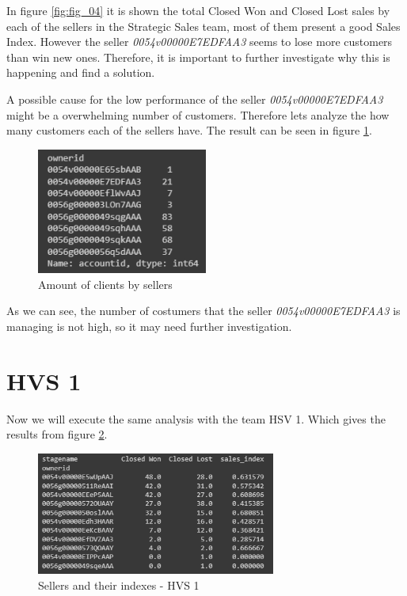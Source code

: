 \documentclass[]{report}
\begin{document}
In figure \ref{fig:fig_04} it is shown the total Closed Won and Closed Lost sales by each of the sellers in the Strategic Sales team, most of them present a good Sales Index. However the seller \textit{0054v00000E7EDFAA3} seems to lose more customers than win new ones. Therefore, it is important to further investigate why this is happening and find a solution.

A possible cause for the low performance of the seller \textit{0054v00000E7EDFAA3} might be a overwhelming number of customers. Therefore lets analyze the how many customers each of the sellers have. The result can be seen in figure \ref{fig:fig_05}.

\begin{figure}[htb]
	\centering
	\includegraphics[width=0.50\textwidth]{fig_05_customer_and_sellers}
	\caption{Amount of clients by sellers}
	\label{fig:fig_05}
\end{figure}

As we can see, the number of costumers that the seller \textit{0054v00000E7EDFAA3} is managing is not high, so it may need further investigation.

\section{HVS 1}

Now we will execute the same analysis with the team HSV 1. Which gives the results from figure \textcolor{blue}{\ref{fig:fig_06}}.

\begin{figure}[htb]
	\centering
	\includegraphics[width=0.70\textwidth]{fig_06_sellers_hs1}
	\caption{Sellers and their indexes - HVS 1}
	\label{fig:fig_06}
\end{figure}
\end{document}
